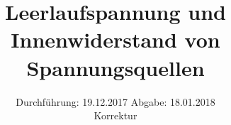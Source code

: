 

\subject{V301}
\title{Leerlaufspannung und Innenwiderstand von Spannungsquellen}
\date{%
  Durchführung: 19.12.2017
  \hspace{3em}
  Abgabe: 18.01.2018 \\
  Korrektur
}



\maketitle
\thispagestyle{empty}
\tableofcontents
\newpage






\printbibliography{}


